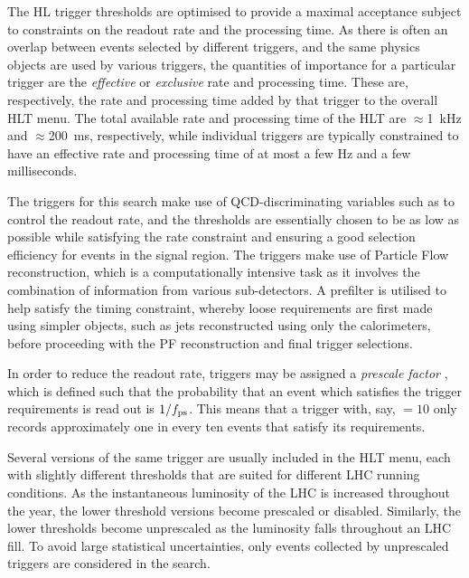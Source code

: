 The HL trigger thresholds are optimised to provide a maximal acceptance 
subject to 
constraints on the readout rate and the processing time. As there is often an 
overlap between events selected by different triggers, and the same physics 
objects are used by various triggers, the quantities of importance for a 
particular trigger are the \textit{effective} or \textit{exclusive} rate and 
processing time. These 
are, respectively, the rate and processing time added by that trigger to the 
overall HLT menu. The total available rate and processing time of the HLT are 
$\approx$1~kHz and $\approx$200~ms, respectively, while individual triggers are 
typically constrained to have an effective rate and processing time of at most 
a few Hz and a few milliseconds.

The triggers for this search make use of QCD-discriminating variables such as 
\alphat to control the readout rate, and the thresholds are essentially chosen 
to be as low as possible while satisfying the rate constraint and ensuring a 
good selection efficiency for events in the signal region.
The triggers make use of Particle Flow reconstruction, which is a 
computationally intensive task as it involves the combination of information 
from various sub-detectors. A prefilter is utilised to help satisfy the timing 
constraint, whereby loose 
requirements are first made using simpler objects, such as jets reconstructed 
using only the calorimeters, before proceeding with the PF reconstruction and 
final trigger selections.

In order to reduce the readout rate, triggers may be assigned a 
\textit{prescale factor} \prescale, which is defined such that the probability 
that an event which satisfies the trigger requirements is read out is 
$1/f_{\text{ps}}$. This means that a trigger with, say, \prescale$=10$ only records 
approximately one in every ten events that satisfy its requirements.

Several versions of the same trigger are usually included in the HLT menu, each 
with slightly different thresholds that are suited for different LHC running 
conditions. As the instantaneous luminosity of the LHC is increased throughout 
the year, the lower threshold versions become prescaled or 
disabled. Similarly, the lower thresholds become unprescaled as the luminosity 
falls throughout an LHC fill. To avoid large statistical uncertainties, only 
events collected by unprescaled triggers are considered in the search.

